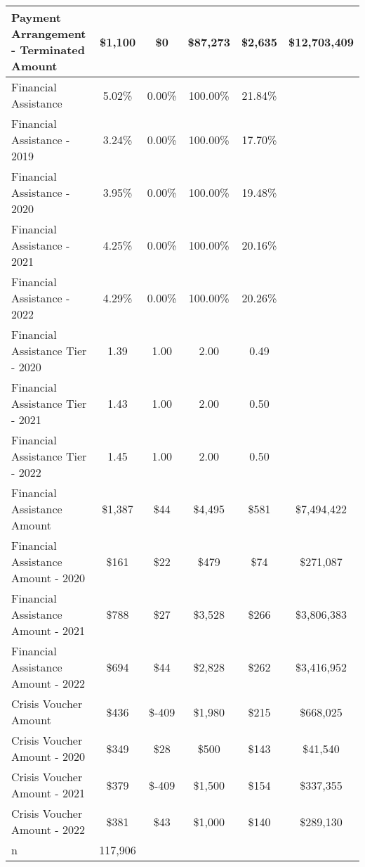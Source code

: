 \begin{tabular}{l|c|c|c|c|c}
\quad Payment Arrangement - Terminated Amount & \$1,100 & \$0 & \$87,273 & \$2,635 & \$12,703,409 \\
\midrule 
Financial Assistance & 5.02\% & 0.00\% & 100.00\% & 21.84\% \\
\quad Financial Assistance - 2019 & 3.24\% & 0.00\% & 100.00\% & 17.70\% \\
\quad Financial Assistance - 2020 & 3.95\% & 0.00\% & 100.00\% & 19.48\% \\
\quad Financial Assistance - 2021 & 4.25\% & 0.00\% & 100.00\% & 20.16\% \\
\quad Financial Assistance - 2022 & 4.29\% & 0.00\% & 100.00\% & 20.26\% \\
\midrule 
Financial Assistance Tier - 2020 & 1.39 & 1.00 & 2.00 & 0.49 \\
Financial Assistance Tier - 2021 & 1.43 & 1.00 & 2.00 & 0.50 \\
Financial Assistance Tier - 2022 & 1.45 & 1.00 & 2.00 & 0.50 \\
\midrule 
Financial Assistance Amount & \$1,387 & \$44 & \$4,495 & \$581 & \$7,494,422 \\
\quad Financial Assistance Amount - 2020 & \$161 & \$22 & \$479 & \$74 & \$271,087 \\
\quad Financial Assistance Amount - 2021 & \$788 & \$27 & \$3,528 & \$266 & \$3,806,383 \\
\quad Financial Assistance Amount - 2022 & \$694 & \$44 & \$2,828 & \$262 & \$3,416,952 \\
\midrule 
Crisis Voucher Amount & \$436 & \$-409 & \$1,980 & \$215 & \$668,025 \\
\quad Crisis Voucher Amount - 2020 & \$349 & \$28 & \$500 & \$143 & \$41,540 \\
\quad Crisis Voucher Amount - 2021 & \$379 & \$-409 & \$1,500 & \$154 & \$337,355 \\
\quad Crisis Voucher Amount - 2022 & \$381 & \$43 & \$1,000 & \$140 & \$289,130 \\
\midrule 
n & 117,906 &  &  &  &  \\
\midrule 
\bottomrule 
\end{tabular}
